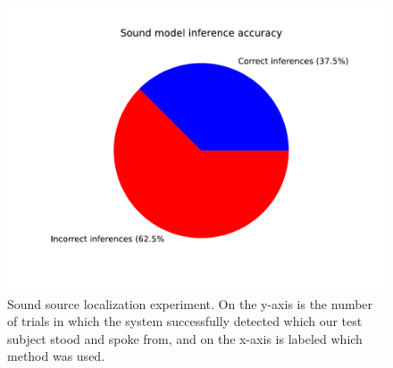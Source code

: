 \documentclass{article}
\begin{document}
\begin{figure}
\begin{center}
\centerline{\includegraphics[width=\columnwidth]{sound_model_accuracy_chart}}
\caption{Sound source localization experiment. On the y-axis is the number of trials in which the system successfully detected which our test subject stood and spoke from, and on the x-axis is labeled which method was used.}
\end{center}
\end{figure}
\end{document}
